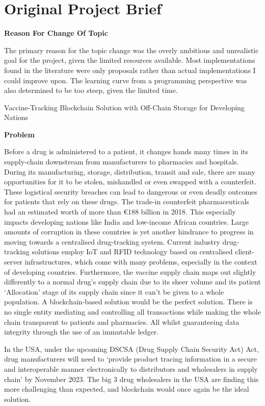 \chapter{Original Project Brief}

\large \textbf{Reason For Change Of Topic}

The primary reason for the topic change was the overly ambitious and unrealistic goal for the project, given the limited resources available.  Most implementations found in the literature were only proposals rather than actual implementations I could improve upon. The learning curve from a programming perspective was also determined to be too steep, given the limited time. 

\LARGE{Vaccine-Tracking Blockchain Solution with Off-Chain Storage for Developing Nations} 

\large \textbf{Problem}

Before a drug is administered to a patient, it changes hands many times in its supply-chain downstream from manufacturers to pharmacies and hospitals. During its manufacturing, storage, distribution, transit and sale, there are many opportunities for it to be stolen, mishandled or even swapped with a counterfeit. These logistical security breaches can lead to dangerous or even deadly outcomes for patients that rely on these drugs. The trade-in counterfeit pharmaceuticals had an 
estimated worth of more than €188 billion in 2018. This especially impacts developing nations like India and low-income African countries. Large amounts of corruption in these countries is yet another hindrance to progress in moving towards a centralised drug-tracking system. Current industry drug-tracking solutions employ IoT and RFID technology based on centralised client-server infrastructures, which come with many problems, especially in the context of developing countries. 
Furthermore, the vaccine supply chain maps out slightly differently to a normal drug’s supply chain due to its sheer volume and its patient ‘Allocation’ stage of its supply chain since it can’t be given to a whole population. A blockchain-based solution would be the perfect solution. There is no single entity mediating and controlling all transactions while making the whole chain transparent to patients and pharmacies. All whilst guaranteeing data integrity through the use of an immutable ledger.

In the USA, under the upcoming DSCSA (Drug Supply Chain Security Act) Act, drug manufacturers will need to ‘provide product tracing information in a secure and interoperable manner electronically to distributors and wholesalers in supply chain’ by November 2023. The big 3 drug wholesalers in the USA are finding this more challenging than expected, and blockchain would once again be the ideal solution.

